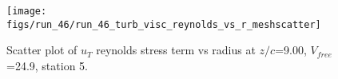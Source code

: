 \begin{figure}[H]
\centering
\texttt{[image: figs/run\_46/run\_46\_turb\_visc\_reynolds\_vs\_r\_meshscatter]}
\caption{Scatter plot of $
u_T$ reynolds stress term vs radius at $z/c$=9.00, $V_{free}$=24.9, station 5.}
\label{fig:run_46_turb_visc_reynolds_vs_r_meshscatter}
\end{figure}


